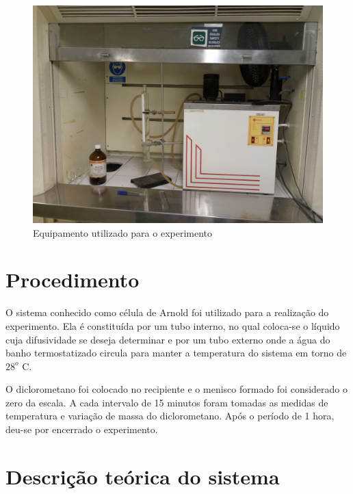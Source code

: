 \begin{figure}[H]
	\begin{center}
		\includegraphics[scale=0.2,trim={0 0 0 0}]{figuras/ladeq/difusao/aparato}
		\caption{Equipamento utilizado para o experimento}
		\label{apa}
	\end{center}
\end{figure}


\chapter{Procedimento}

O sistema conhecido como célula de Arnold foi utilizado para a realização do experimento. Ela é constituída por um tubo interno, no qual coloca-se o líquido cuja difusividade se deseja determinar e por um tubo externo onde a água do banho termostatizado circula para manter a temperatura do sistema em torno de $28^{o}$ C.

O diclorometano foi colocado no recipiente e o menisco formado foi considerado o zero da escala. A cada intervalo de 15 minutos foram tomadas as medidas de temperatura e variação de massa do diclorometano. Após o período de 1 hora, deu-se por encerrado o experimento.
\\

\chapter{Descrição teórica do sistema}

